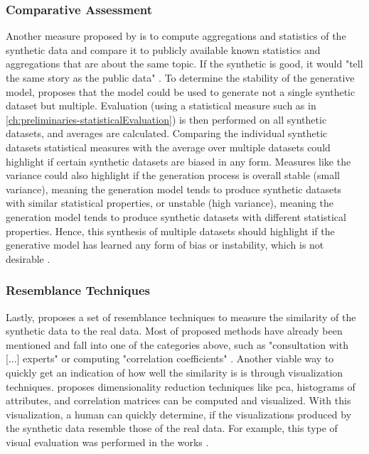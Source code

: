 \subsubsection{Comparative Assessment}
Another measure proposed by \cite{elemam2020SevenWaysEvaluate} is to compute aggregations and statistics of the synthetic data and compare it to publicly available known statistics and aggregations that are about the same topic.
If the synthetic is good, it would "tell the same story as the public data" \cite[p. 58]{elemam2020SevenWaysEvaluate}.
To determine the stability of the generative model, \textcite{elemam2020SevenWaysEvaluate} proposes that the model could be used to generate not a single synthetic dataset but multiple.
Evaluation (\eg using a statistical measure such as in \autoref{ch:preliminaries-statisticalEvaluation}) is then performed on all synthetic datasets, and averages are calculated.
Comparing the individual synthetic datasets statistical measures with the average over multiple datasets could highlight if certain synthetic datasets are biased in any form.
Measures like the variance could also highlight if the generation process is overall stable (small variance), meaning the generation model tends to produce synthetic datasets with similar statistical properties, 
or unstable (high variance), meaning the generation model tends to produce synthetic datasets with different statistical properties. 
Hence, this synthesis of multiple datasets should highlight if the generative model has learned any form of bias or instability, which is not desirable \cite{elemam2020SevenWaysEvaluate}.

\subsubsection{Resemblance Techniques}
Lastly, \cite{hernandez2022SyntheticDataGeneration} proposes a set of resemblance techniques to measure the similarity of the synthetic data to the real data.
Most of \cite{hernandez2022SyntheticDataGeneration} proposed methods have already been mentioned and fall into one of the categories above, such as "consultation with [...] experts" or computing "correlation coefficients" \cite{hernandez2022SyntheticDataGeneration}.
Another viable way to quickly get an indication of how well the similarity is is through visualization techniques.
\textcite{hernandez2022SyntheticDataGeneration} proposes dimensionality reduction techniques like \gls{pca}, histograms of attributes, and correlation matrices can be computed and visualized.
With this visualization, a human can quickly determine, if the visualizations produced by the synthetic data resemble those of the real data.
For example, this type of visual evaluation was performed in the works \textcite{li2022TTSGANTransformerbasedTimeSeries, leminh2021AirGenGANbasedSynthetica, mckeever2020SynthesisingTabularDatasets}.


